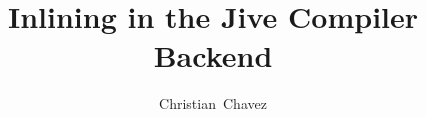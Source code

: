 \documentclass[a4paper,12pt]{article}
\begin{document}
\setlength{\parskip}{1ex}
\setlength{\parindent}{0pt}

\title{Inlining in the Jive Compiler Backend}
\author{Christian~Chavez}
\maketitle

\vfill


\clearpage
\tableofcontents

\clearpage









\clearpage
\listoffigures

\clearpage
{}
\lstlistoflistings

\clearpage



\clearpage
\appendix
\addappheadtotoc

\end{document}
